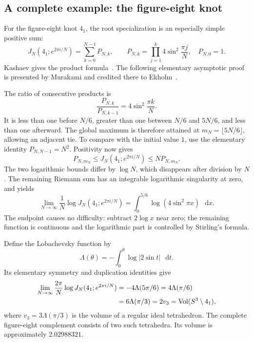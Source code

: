 \documentclass[11pt,a4paper]{article}
\numberwithin{equation}{section}
\theoremstyle{definition}
\theoremstyle{remark}
\DeclareMathOperator{\Vol}{Vol}
\newcommand{\dd}{\mathop{}\!\mathrm d}
\begin{document}
\subsection{A complete example: the figure-eight knot}
\label{sec:introfigureeight}

For the figure-eight knot $4_1$, the root specialization is an
especially simple positive sum:
\begin{equation}
 \boxed{\quad
 J_N(4_1;e^{2\pi i/N})=\sum_{k=0}^{N-1}P_{N,k},\qquad
 P_{N,k}=\prod_{j=1}^{k}4\sin^2\frac{\pi j}{N},\quad P_{N,0}=1.
 \quad}
 \label{eq:introfigureproduct}
\end{equation}
Kashaev gives the product formula~\cite[eqs. (2.2), (2.5)]{KashaevVolume}.
The following elementary asymptotic proof is presented by
Murakami and credited there to Ekholm~\cite[Section 3.2]{MurakamiIntro}.

The ratio of consecutive products is
\[
 \frac{P_{N,k}}{P_{N,k-1}}=4\sin^2\frac{\pi k}{N}.
\]
It is less than one before $N/6$, greater than one between $N/6$
and $5N/6$, and less than one afterward. The global maximum is
therefore attained at $m_N=\lfloor5N/6\rfloor$, allowing an adjacent
tie. To compare with the initial value $1$, use the elementary
identity $P_{N,N-1}=N^2$. Positivity now gives
\[
 P_{N,m_N}\le J_N(4_1;e^{2\pi i/N})\le N P_{N,m_N}.
\]
The two logarithmic bounds differ by $\log N$, which disappears
after division by $N$. The remaining Riemann sum has an integrable
logarithmic singularity at zero, and yields
\begin{equation}
 \lim_{N\to\infty}\frac1N\log J_N(4_1;e^{2\pi i/N})
 =\int_0^{5/6}\log(4\sin^2\pi x)\,\dd x.
 \label{eq:introfigureintegral}
\end{equation}
The endpoint causes no difficulty: subtract $2\log x$ near zero;
the remaining function is continuous and the logarithmic part is
controlled by Stirling's formula.

Define the Lobachevsky function by
\[
 \Lambda(\theta)=-\int_0^\theta\log|2\sin t|\,\dd t.
\]
Its elementary symmetry and duplication identities give
\begin{align}
 \lim_{N\to\infty}\frac{2\pi}{N}
       \log J_N(4_1;e^{2\pi i/N})
 &=-4\Lambda(5\pi/6)=4\Lambda(\pi/6)\notag\\
 &=6\Lambda(\pi/3)=2v_3
  =\Vol(S^3\setminus4_1),
 \label{eq:introfigurevolume}
\end{align}
where $v_3=3\Lambda(\pi/3)$ is the volume of a regular ideal
tetrahedron. The complete figure-eight complement consists of two
such tetrahedra. Its volume is approximately $2.02988321$.
\end{document}

